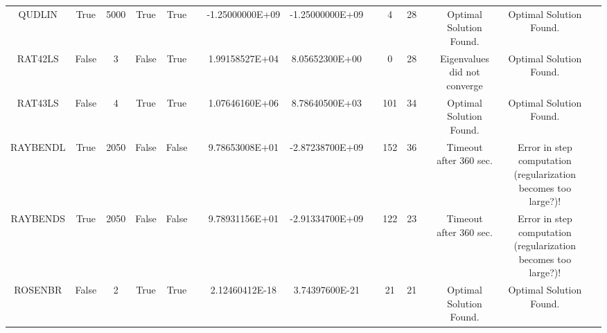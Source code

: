 \begin{longtable}{ccccccccccccccc}
	\cellcolor{default2} QUDLIN& \cellcolor{default2} True& \cellcolor{default2} 5000& \cellcolor{default2} True& \cellcolor{default2} True& \cellcolor{header} & \cellcolor{best} -1.25000000E+09& \cellcolor{best} -1.25000000E+09& \cellcolor{header} & \cellcolor{best} 4& \cellcolor{poor} 28& \cellcolor{header} & \cellcolor{default2} Optimal Solution Found.& \cellcolor{default2} Optimal Solution Found.& \cellcolor{header} \\
	\cellcolor{default1} RAT42LS& \cellcolor{default1} False& \cellcolor{default1} 3& \cellcolor{default1} False& \cellcolor{default1} True& \cellcolor{header} & \cellcolor{poor} 1.99158527E+04& \cellcolor{best} 8.05652300E+00& \cellcolor{header} & \cellcolor{best} 0& \cellcolor{poor} 28& \cellcolor{header} & \cellcolor{default1} Eigenvalues did not converge& \cellcolor{default1} Optimal Solution Found.& \cellcolor{header} \\
	\cellcolor{default2} RAT43LS& \cellcolor{default2} False& \cellcolor{default2} 4& \cellcolor{default2} True& \cellcolor{default2} True& \cellcolor{header} & \cellcolor{poor} 1.07646160E+06& \cellcolor{best} 8.78640500E+03& \cellcolor{header} & \cellcolor{poor} 101& \cellcolor{best} 34& \cellcolor{header} & \cellcolor{default2} Optimal Solution Found.& \cellcolor{default2} Optimal Solution Found.& \cellcolor{header} \\
	\cellcolor{default1} RAYBENDL& \cellcolor{default1} True& \cellcolor{default1} 2050& \cellcolor{default1} False& \cellcolor{default1} False& \cellcolor{header} & \cellcolor{poor} 9.78653008E+01& \cellcolor{best} -2.87238700E+09& \cellcolor{header} & \cellcolor{poor} 152& \cellcolor{best} 36& \cellcolor{header} & \cellcolor{default1} Timeout after 360 sec.& \cellcolor{default1} Error in step computation (regularization becomes too large?)!& \cellcolor{header} \\
	\cellcolor{default2} RAYBENDS& \cellcolor{default2} True& \cellcolor{default2} 2050& \cellcolor{default2} False& \cellcolor{default2} False& \cellcolor{header} & \cellcolor{poor} 9.78931156E+01& \cellcolor{best} -2.91334700E+09& \cellcolor{header} & \cellcolor{poor} 122& \cellcolor{best} 23& \cellcolor{header} & \cellcolor{default2} Timeout after 360 sec.& \cellcolor{default2} Error in step computation (regularization becomes too large?)!& \cellcolor{header} \\
	\cellcolor{default1} ROSENBR& \cellcolor{default1} False& \cellcolor{default1} 2& \cellcolor{default1} True& \cellcolor{default1} True& \cellcolor{header} & \cellcolor{ok} 2.12460412E-18& \cellcolor{best} 3.74397600E-21& \cellcolor{header} & \cellcolor{best} 21& \cellcolor{best} 21& \cellcolor{header} & \cellcolor{default1} Optimal Solution Found.& \cellcolor{default1} Optimal Solution Found.& \cellcolor{header} \\

\end{longtable}
